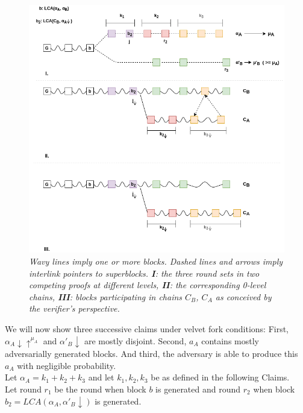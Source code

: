 \begin{figure}[h!]
	\begin{center}
		\includegraphics[scale=0.5]{figures/proof_velvet.png}
	\end{center}
	\caption{\textit{ Wavy lines imply one or more blocks. Dashed lines and arrows imply
	interlink pointers to superblocks. \textbf{I}: the three round sets in two competing
	proofs at different levels, \textbf{II}: the corresponding 0-level chains,
	\textbf{III}: blocks participating in chains $C_B$, $C_A$ as conceived by 
    the verifier's perspective.}}	
    \label{fig:proof_velvet}
\end{figure}

We will now show three successive claims under velvet fork conditions: First,
$\alpha_A \downarrow \uparrow^{\mu_A}$ and $\alpha'_B \downarrow$ are mostly
disjoint. Second, $a_A$ contains mostly adversarially generated blocks. And third,
the adversary is able to produce this $a_A$ with negligible probability.\\
Let $\alpha_A = k_1 + k_2 + k_3$ and let $k_1, k_2, k_3$ be as defined in the
following Claims.\\
Let round $r_1$ be the round when block $b$ is generated and round $r_2$ when block
$b_2 = LCA(\alpha_A, \alpha'_B\downarrow)$ is generated.\\

